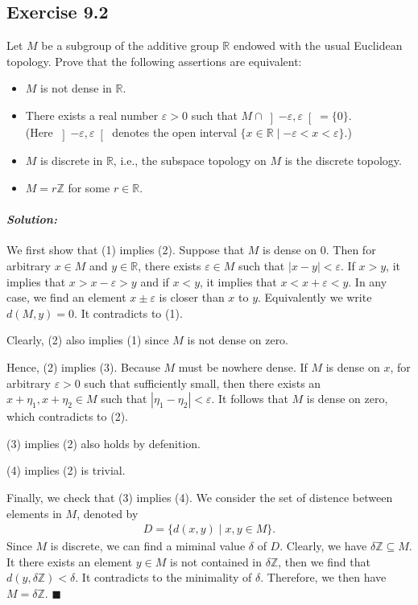 \documentclass[12pt, a4paper]{article}
\newenvironment{solution}
  {\paragraph{\textit{Solution:}}\par\medskip}
  {\hfill$\blacksquare$\vspace{0.1cm}}
\begin{document}
\subsection*{Exercise 9.2}
 Let $M$ be a subgroup of the additive group $\mathbb{R}$ endowed with the usual Euclidean topology. Prove that the following assertions are equivalent:
\begin{itemize}
    \item[(i)] $M$ is not dense in $\mathbb{R}$.
    \item[(ii)] There exists a real number $\varepsilon > 0$ such that $M \cap \left]-\varepsilon, \varepsilon\right[ = \{0\}$.\\
    (Here $\left]-\varepsilon, \varepsilon\right[$ denotes the open interval $\{x \in \mathbb{R} \mid -\varepsilon < x < \varepsilon\}$.)
    \item[(iii)] $M$ is discrete in $\mathbb{R}$, i.e., the subspace topology on $M$ is the discrete topology.
    \item[(iv)] $M = r\mathbb{Z}$ for some $r \in \mathbb{R}$.
\end{itemize}
\begin{solution}
    We first show that (1) implies (2). Suppose that $M$ is dense on $0$. Then for arbitrary $x\in M$ and $y\in \mathbb{R}$, there exists $\varepsilon\in M$ such that $|x-y|<\varepsilon$.
    If $x>y$, it implies that $x>x-\varepsilon>y$ and if $x<y$, it implies that $x<x+\varepsilon<y$. In any case, we find an element $x\pm\varepsilon$ is closer than $x$ to $y$.
    Equivalently we write $d(M,y)=0$. It contradicts to (1).

    Clearly, (2) also implies (1) since $M$ is not dense on zero.

    Hence, (2) implies (3). Because $M$ must be nowhere dense. If $M$ is dense on $x$, for arbitrary $\varepsilon>0$ such that sufficiently small, then there exists an $x+\eta_1,x+\eta_2\in M$ such that $|\eta_1-\eta_2|<\varepsilon$.
    It follows that $M$ is dense on zero, which contradicts to (2).

    (3) implies (2) also holds by defenition.

    (4) implies (2) is trivial.

    Finally, we check that (3) implies (4). We consider the set of distence between elements in $M$, denoted by 
    \begin{align*}
        D=\{d(x,y)\mid x,y\in M\}.
    \end{align*}
    Since $M$ is discrete, we can find a miminal value $\delta$ of $D$. Clearly, we have $\delta\mathbb Z\subseteq M$. 
    It there exists an element $y\in M$ is not contained in $\delta \mathbb{Z}$, then we find that $d(y,\delta \mathbb{Z})<\delta$. It contradicts to the minimality of $\delta$.
    Therefore, we then have $M=\delta \mathbb{Z}$.
\end{solution}
\end{document}
